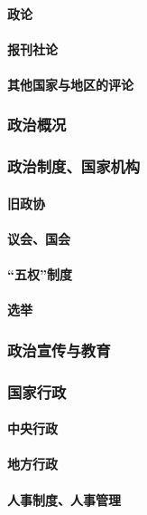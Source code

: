 \documentclass[UTF8]{../RepresentationUniverse}
\begin{document}
        \paragraph{政论}
        \paragraph{报刊社论}
        \paragraph{其他国家与地区的评论}

    \subsubsection{政治概况}
    \subsubsection{政治制度、国家机构}
        \paragraph{旧政协}
        \paragraph{议会、国会}
        \paragraph{“五权”制度}
        \paragraph{选举}

    \subsubsection{政治宣传与教育}
    \subsubsection{国家行政}
        \paragraph{中央行政}
        \paragraph{地方行政}
        \paragraph{人事制度、人事管理}
\end{document}
